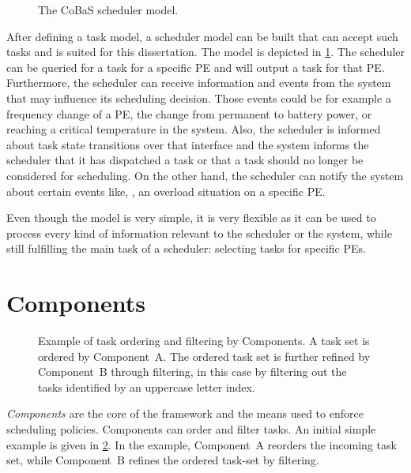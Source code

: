 \begin{figure}[t!] \centering
	\caption[The CoBaS scheduler model.]{The CoBaS scheduler model.}\vspace{-2.5mm}%
	\label{fig:arch:cobas-model}
\end{figure}

After defining a task model, a scheduler model can be built that can accept such tasks and is suited for this dissertation. The model is depicted in \cref{fig:arch:cobas-model}. The scheduler can be queried for a task for a specific \ac{PE} and will output a task for that \ac{PE}. Furthermore, the scheduler can receive information and events from the system that may influence its scheduling decision. Those events could be for example a frequency change of a \ac{PE}, the change from permanent to battery power, or reaching a critical temperature in the system. Also, the scheduler is informed about task state transitions over that interface and the system informs the scheduler that it has dispatched a task or that a task should no longer be considered for scheduling. On the other hand, the scheduler can notify the system about certain events like, \eg{}, an overload situation on a specific \ac{PE}.

Even though the model is very simple, it is very flexible as it can be used to process every kind of information relevant to the scheduler or the system, while still fulfilling the main task of a scheduler: selecting tasks for specific \acp{PE}.

\section{Components}%
\label{sec:arch:components}

\begin{figure}[b!] \centering \vspace{-2.5mm}
	\caption[Example of task ordering and filtering by \cobas{} Components.]{Example of task ordering and filtering by \cobas{} Components. A task set is ordered by Component~A. The ordered task set is further refined by Component~B through filtering, in this case by filtering out the tasks identified by an uppercase letter index.}%
	\label{fig:arch:components}
\end{figure}

\emph{Components} are the core of the \cobas{} framework and the means used to enforce scheduling policies. Components can order and filter tasks. An initial simple example is given in \cref{fig:arch:components}. In the example, Component~A reorders the incoming task set, while Component~B refines the ordered task-set by filtering.

